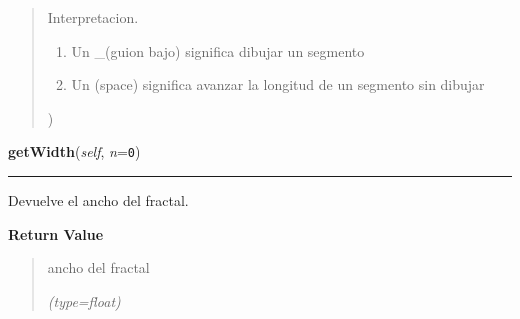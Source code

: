 \begin{boxedminipage}{\funcwidth}
\begin{quote}
{\begin{itemize}
\begin{enumerate}
          \end{enumerate}

      \end{itemize}

      Interpretacion.

      \begin{enumerate}

      \setlength{\parskip}{0.5ex}
        \item Un \_(guion bajo) significa dibujar un segmento

        \item Un (space) significa avanzar la longitud de un segmento sin 
          dibujar

      \end{enumerate})}

      \end{quote}

    \end{boxedminipage}

    \label{FractalZE:cantor:Cantor:getWidth}

    \vspace{0.5ex}

\hspace{.8\funcindent}\begin{boxedminipage}{\funcwidth}

    \raggedright \textbf{getWidth}(\textit{self}, \textit{n}={\tt 0})

    \vspace{-1.5ex}

    \rule{\textwidth}{0.5\fboxrule}
\setlength{\parskip}{2ex}
    Devuelve el ancho del fractal.

\setlength{\parskip}{1ex}
      \textbf{Return Value}
    \vspace{-1ex}

      \begin{quote}
      ancho del fractal

      {\it (type=float)}

      \end{quote}

    \end{boxedminipage}

    \label{FractalZE:cantor:Cantor:getHeight}

